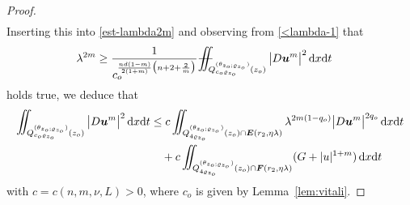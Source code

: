 \documentclass[a4paper, 10pt, american]{amsart}
\numberwithin{theorem}{section}
\numberwithin{equation}{section}
\newcommand{\dxdt}{\,\mathrm{d}x\mathrm{d}t}
\renewcommand{\rho}{\varrho}
\newcommand{\power}[2]{\bm{#1^{\mbox{\unboldmath{\scriptsize$#2$}}}}}
\def\Xiint#1{\mathchoice
    {\XXiint\displaystyle\textstyle{#1}}%
    {\XXiint\textstyle\scriptstyle{#1}}%
    {\XXiint\scriptstyle\scriptscriptstyle{#1}}%
    {\XXiint\scriptscriptstyle\scriptscriptstyle{#1}}%
    \!\iint}
\def\XXiint#1#2#3{\setbox0=\hbox{$#1{#2#3}{\iint}$}
    \vcenter{\hbox{$#2#3$}}\kern-0.5\wd0}
\def\biint{\Xiint{-\!-}}
\begin{document}
\begin{proof}
\begin{align*}
\end{align*}
Inserting this into \eqref{est-lambda2m} and observing from
\eqref{<lambda-1} that 
\begin{align*}
	\lambda^{2m}
	&
	\ge
	\frac{1}{c_o^{\frac{nd(1-m)}{2(1+m)}\big(n+2+\frac2m\big)}}
	\biint_{Q_{ c_o\rho_{z_o}}^{(\theta_{z_o;\rho_{z_o}})}(z_o)} 
	\big|D\power{u}{m}\big|^2 \dxdt
\end{align*}
holds true, we deduce that
\begin{align}\label{level-est}
	\iint_{Q_{ c_o\rho_{z_o}}^{(\theta_{z_o;\rho_{z_o}})}(z_o)} 
	\big|D\power{u}{m}\big|^2 \dxdt 
	&\le
    c
    \iint_{Q_{4\rho_{z_o}}^{(\theta_{z_o;\rho_{z_o}})}(z_o)\cap \boldsymbol E(r_2,\eta\lambda)} 
	\lambda^{2m(1-q_o)}\big|D\power{u}{m}\big|^{2q_o} \dxdt \nonumber\\
	&\quad +
	c
	\iint_{Q_{4\rho_{z_o}}^{(\theta_{z_o;\rho_{z_o}})}(z_o)\cap \boldsymbol F(r_2,\eta\lambda)} 
	(G+|u|^{1+m}) \dxdt
\end{align}
with $c=c(n,m,\nu ,L)>0$, where $c_o$ is given by Lemma~\ref{lem:vitali}.


\end{proof}
\end{document}
